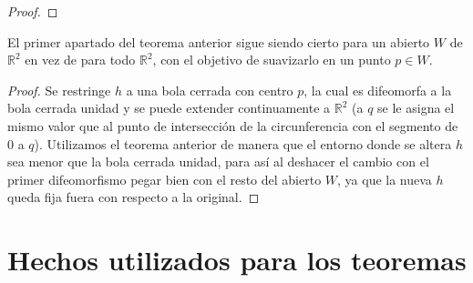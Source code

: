 \begin{proof}
	\end{proof}


	\begin{corolario}
		El primer apartado del teorema anterior sigue siendo cierto para un abierto $W$ de $\mathbb{R}^2$ en vez de para todo $\mathbb{R}^2$, con el objetivo de suavizarlo en un punto $p \in W$.
	\end{corolario}
	
	\begin{proof}
		Se restringe $h$ a una bola cerrada con centro $p$, la cual es difeomorfa a la bola cerrada unidad y se puede extender continuamente a $\mathbb{R}^2$ (a $q$ se le asigna el mismo valor que al punto de intersección de la circunferencia con el segmento de $0$ a $q$). Utilizamos el teorema anterior de manera que el entorno donde se altera $h$ sea menor que la bola cerrada unidad, para así al deshacer el cambio con el primer difeomorfismo pegar bien con el resto del abierto $W$, ya que la nueva $h$ queda fija fuera con respecto a la original.
	\end{proof}



\section{Hechos utilizados para los teoremas}

\endinput
